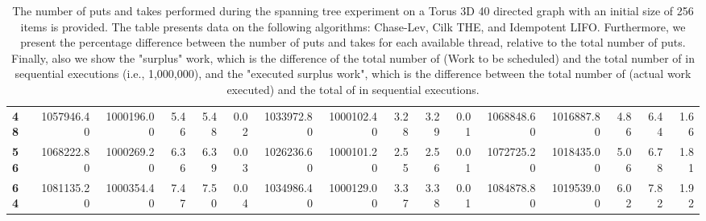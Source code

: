 \begin{table}[!ht]
{\begin{tabular}{lrrrrrrrrrrrrrrr}
\textbf{48} & 1057946.40 & 1000196.00 &           5.46 &        5.48 &                 0.02 & 1033972.80 & 1000102.40 &           3.28 &        3.29 &                 0.01 &      1068848.60 & 1016887.80 &           4.86 &        6.44 &                 1.66 \\
\textbf{56} & 1068222.80 & 1000269.20 &           6.36 &        6.39 &                 0.03 & 1026236.60 & 1000101.20 &           2.55 &        2.56 &                 0.01 &      1072725.20 & 1018435.00 &           5.06 &        6.78 &                 1.81 \\
\textbf{64} & 1081135.20 & 1000354.40 &           7.47 &        7.50 &                 0.04 & 1034986.40 & 1000129.00 &           3.37 &        3.38 &                 0.01 &      1084878.80 & 1019539.00 &           6.02 &        7.82 &                 1.92 \\
\bottomrule
\end{tabular}}
\label{difference-Torus_3D_40_directed-256-CHASELEV-CILK-IDEMPOTENT_LIFO}
\caption{The number of puts and takes performed during the
    spanning tree experiment on a Torus 3D 40 directed graph with an initial size
    of 256 items is provided. The table presents data on the
    following algorithms: Chase-Lev, Cilk THE, and
    Idempotent LIFO. Furthermore, we present the percentage difference
    between the number of puts and takes for each available thread,
    relative to the total number of puts. Finally, also we show the
    "surplus" work, which is the difference of the total number of
    \Puts (Work to be scheduled) and the total number of \Puts in
    sequential executions (i.e., 1,000,000), and the "executed surplus
    work", which is the difference between the total number of \Takes
    (actual work executed) and the total of \Takes in sequential
    executions.}
\end{table}
